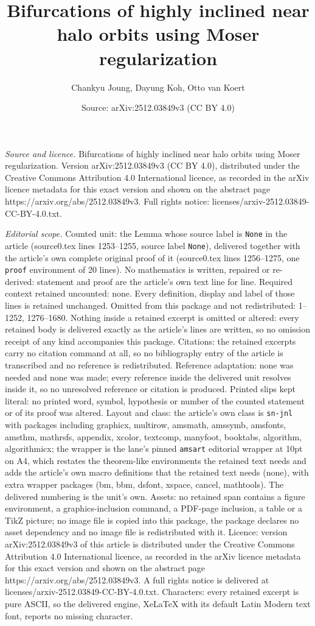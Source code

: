 \documentclass[10pt,a4paper]{amsart}
\title[Bifurcations of highly inclined near halo orbits using Moser]{Bifurcations of highly inclined near halo orbits using Moser regularization}
\author{Chankyu Joung, Dayung Koh, Otto van Koert}
\date{Source: arXiv:2512.03849v3 (CC BY 4.0)}
\begin{document}
\maketitle

\noindent\emph{Source and licence.} Bifurcations of highly inclined near halo orbits using Moser regularization. Version arXiv:2512.03849v3 (CC BY 4.0), distributed under the Creative Commons Attribution 4.0 International licence, as recorded in the arXiv licence metadata for this exact version and shown on the abstract page https://arxiv.org/abs/2512.03849v3. Full rights notice: licenses/arxiv-2512.03849-CC-BY-4.0.txt.\par\smallskip

\noindent\textit{Editorial scope.} Counted unit: the Lemma whose source label is \texttt{None} in the article (source0.tex lines 1253--1255, source label \texttt{None}), delivered together with the article's own complete original proof of it (source0.tex lines 1256--1275, one \texttt{proof} environment of 20 lines). No mathematics is written, repaired or re-derived: statement and proof are the article's own text line for line. Required context retained uncounted: none. Every definition, display and label of those lines is retained unchanged. Omitted from this package and not redistributed: 1--1252, 1276--1680. Nothing inside a retained excerpt is omitted or altered: every retained body is delivered exactly as the article's lines are written, so no omission receipt of any kind accompanies this package. Citations: the retained excerpts carry no citation command at all, so no bibliography entry of the article is transcribed and no reference is redistributed. Reference adaptation: none was needed and none was made; every reference inside the delivered unit resolves inside it, so no unresolved reference or citation is produced. Printed slips kept literal: no printed word, symbol, hypothesis or number of the counted statement or of its proof was altered. Layout and class: the article's own class is \texttt{sn-jnl} with packages including graphicx, multirow, amsmath, amssymb, amsfonts, amsthm, mathrsfs, appendix, xcolor, textcomp, manyfoot, booktabs, algorithm, algorithmicx; the wrapper is the lane's pinned \texttt{amsart} editorial wrapper at 10pt on A4, which restates the theorem-like environments the retained text needs and adds the article's own macro definitions that the retained text needs (none), with extra wrapper packages (bm, bbm, dsfont, xspace, cancel, mathtools). The delivered numbering is the unit's own. Assets: no retained span contains a figure environment, a graphics-inclusion command, a PDF-page inclusion, a table or a TikZ picture; no image file is copied into this package, the package declares no asset dependency and no image file is redistributed with it. Licence: version arXiv:2512.03849v3 of this article is distributed under the Creative Commons Attribution 4.0 International licence, as recorded in the arXiv licence metadata for this exact version and shown on the abstract page https://arxiv.org/abs/2512.03849v3. A full rights notice is delivered at licenses/arxiv-2512.03849-CC-BY-4.0.txt. Characters: every retained excerpt is pure ASCII, so the delivered engine, XeLaTeX with its default Latin Modern text font, reports no missing character.
\end{document}
